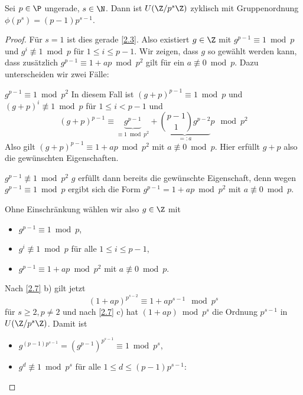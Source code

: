 \begin{st} \label{2.8}
	Sei $p \in \P$ ungerade, $s \in \N$.
	Dann ist $U(\Z / p^s \Z)$ zyklisch mit Gruppenordnung $\phi(p^s) = (p-1)p^{s-1}$.
	\begin{proof}
		Für $s = 1$ ist dies gerade \ref{2.3}.
		Also existiert $g \in \Z$ mit $g^{p-1} \equiv 1 \bmod p$ und $g^i \not\equiv 1 \bmod p$ für $1 \le i \le p -1$.
		Wir zeigen, dass $g$ so gewählt werden kann, dass zusätzlich $g^{p-1} \equiv 1 + ap \bmod p^2$ gilt für ein $a \not\equiv 0 \bmod p$.
		Dazu unterscheiden wir zwei Fälle:
		\begin{segnb}{$g^{p-1} \equiv 1 \bmod p^2$}
			In diesem Fall ist $(g + p)^{p-1} \equiv 1 \bmod p$ und $(g + p)^i \not\equiv 1 \bmod p$ für $1 \le i < p-1$ und
			\[
				(g + p)^{p - 1} \equiv \underbrace{g^{p-1}}_{\equiv 1 \bmod p^2} + \underbrace{\binom{p-1}{1}g^{p-2}}_{=: a} p \mod p^2
			\]
			Also gilt $(g + p)^{p-1} \equiv 1 + ap \bmod p^2$ mit $a \not\equiv 0 \bmod p$.
			Hier erfüllt $g + p$ also die gewünschten Eigenschaften.
		\end{segnb}
		\begin{segnb}{$g^{p-1} \not\equiv 1 \bmod p^2$}
			$g$ erfüllt dann bereits die gewünschte Eigenschaft, denn wegen $g^{p-1} \equiv 1 \bmod p$ ergibt sich die Form $g^{p-1} = 1 + ap \bmod p^2$ mit $a \not\equiv 0 \bmod p$.
		\end{segnb}
		Ohne Einschränkung wählen wir also $g \in \Z$ mit
		\begin{itemize}
			\item
				$g^{p-1} \equiv 1 \bmod p$,
			\item
				$g^i \not\equiv 1 \bmod p$ für alle $1 \le i \le p - 1$,
			\item
				$g^{p-1} \equiv 1 + ap \bmod p^2$ mit $a \not\equiv 0 \bmod p$.
		\end{itemize}
		Nach \ref{2.7} b) gilt jetzt
		\[
			(1 + ap)^{p^{s-2}} \equiv 1 + ap^{s-1} \mod p^s
		\]
		für $s \ge 2, p \neq 2$ und nach \ref{2.7} c) hat $(1 + ap) \bmod p^s$ die Ordnung $p^{s-1}$ in $U(\Z / p^s \Z)$.
		Damit ist
		\begin{itemize}[i)]
			\item
				$g^{(p-1)p^{s-1}} = (g^{p-1})^{p^{s-1}} \equiv 1 \bmod p^s$,
			\item
				$g^d \not\equiv 1 \bmod p^s$ für alle $1 \le d \le (p-1)p^{s-1}$:


\end{itemize}
\end{proof}
\end{st}
